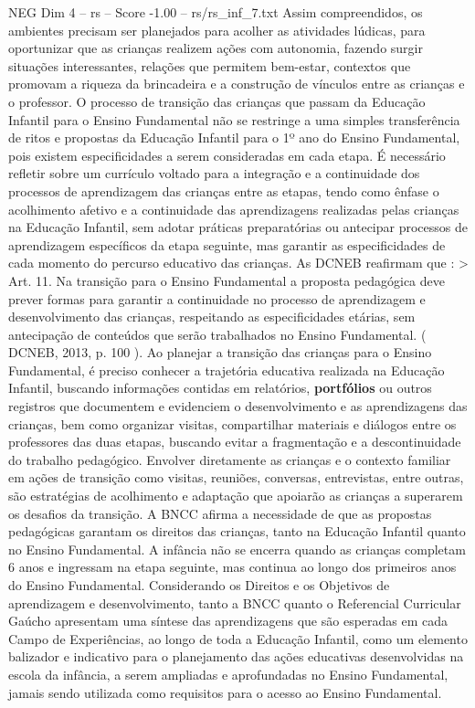 \begin{textsample}{NEG Dim 4 – rs – Score -1.00 – rs/rs\_inf\_7.txt}
Assim compreendidos, os ambientes precisam ser planejados para acolher as atividades lúdicas, para oportunizar que as crianças realizem ações com autonomia, fazendo surgir situações interessantes, relações que permitem bem-estar, contextos que promovam a riqueza da brincadeira e a construção de vínculos entre as crianças e o professor.
O processo de transição das crianças que passam da Educação Infantil para o Ensino Fundamental não se restringe a uma simples transferência de ritos e propostas da Educação Infantil para o 1º ano do Ensino Fundamental, pois existem especificidades a serem consideradas em cada etapa.
É necessário refletir sobre um currículo voltado para a integração e a continuidade dos processos de aprendizagem das crianças entre as etapas, tendo como ênfase o acolhimento afetivo e a continuidade das aprendizagens realizadas pelas crianças na Educação Infantil, sem adotar práticas preparatórias ou antecipar processos de aprendizagem específicos da etapa seguinte, mas garantir as especificidades de cada momento do percurso educativo das crianças.
As DCNEB reafirmam que : > Art. 11.
Na transição para o Ensino Fundamental a proposta pedagógica deve prever formas para garantir a continuidade no processo de aprendizagem e desenvolvimento das crianças, respeitando as especificidades etárias, sem antecipação de conteúdos que serão trabalhados no Ensino Fundamental. ( DCNEB, 2013, p. 100 ).
Ao planejar a transição das crianças para o Ensino Fundamental, é preciso conhecer a trajetória educativa realizada na Educação Infantil, buscando informações contidas em relatórios, \textbf{portfólios} ou outros registros que documentem e evidenciem o desenvolvimento e as aprendizagens das crianças, bem como organizar visitas, compartilhar materiais e diálogos entre os professores das duas etapas, buscando evitar a fragmentação e a descontinuidade do trabalho pedagógico.
Envolver diretamente as crianças e o contexto familiar em ações de transição como visitas, reuniões, conversas, entrevistas, entre outras, são estratégias de acolhimento e adaptação que apoiarão as crianças a superarem os desafios da transição.
A BNCC afirma a necessidade de que as propostas pedagógicas garantam os direitos das crianças, tanto na Educação Infantil quanto no Ensino Fundamental.
A infância não se encerra quando as crianças completam 6 anos e ingressam na etapa seguinte, mas continua ao longo dos primeiros anos do Ensino Fundamental.
Considerando os Direitos e os Objetivos de aprendizagem e desenvolvimento, tanto a BNCC quanto o Referencial Curricular Gaúcho apresentam uma síntese das aprendizagens que são esperadas em cada Campo de Experiências, ao longo de toda a Educação Infantil, como um elemento balizador e indicativo para o planejamento das ações educativas desenvolvidas na escola da infância, a serem ampliadas e aprofundadas no Ensino Fundamental, jamais sendo utilizada como requisitos para o acesso ao Ensino Fundamental.

\end{textsample}

